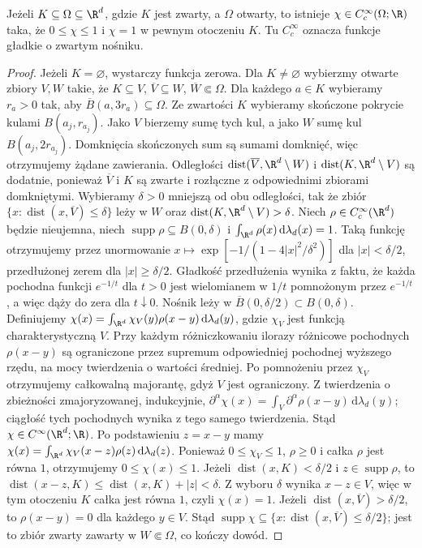 \begin{lemat}
\label{lem:cutoffs17}
Jeżeli $K\subseteq\Omega\subseteq\R^d$, gdzie $K$ jest zwarty,
a $\Omega$ otwarty, to istnieje $\chi\in C_c^\infty(\Omega;\R)$
taka, że $0\le\chi\le1$ i $\chi=1$ w pewnym otoczeniu $K$.
Tu $C_c^\infty$ oznacza funkcje gładkie o zwartym nośniku.
\end{lemat}
\begin{proof}
Jeżeli $K=\varnothing$, wystarczy funkcja zerowa.
Dla $K\ne\varnothing$ wybierzmy otwarte zbiory $V,W$ takie, że
$K\subseteq V$, $\overline V\subseteq W$, $\overline W\Subset\Omega$.
Dla każdego $a\in K$ wybieramy $r_a>0$ tak,
aby $\overline B(a,3r_a)\subseteq\Omega$. Ze zwartości $K$
wybieramy skończone pokrycie kulami $B(a_j,r_{a_j})$.
Jako $V$ bierzemy sumę tych kul, a jako $W$ sumę kul
$B(a_j,2r_{a_j})$. Domknięcia skończonych sum są sumami
domknięć, więc otrzymujemy żądane zawierania.
Odległości $\operatorname{dist}(\overline V,\R^d\setminus W)$
i $\operatorname{dist}(K,\R^d\setminus V)$ są dodatnie,
ponieważ $\overline V$ i $K$ są zwarte
i rozłączne z odpowiednimi zbiorami domkniętymi.
Wybieramy $\delta>0$ mniejszą od obu odległości, tak że zbiór
$\{x:\operatorname{dist}(x,\overline V)\le\delta\}$
leży w $W$ oraz $\operatorname{dist}(K,\R^d\setminus V)>\delta$.
Niech $\rho\in C_c^\infty(\R^d)$ będzie nieujemna,
niech $\operatorname{supp}\rho\subseteq B(0,\delta)$ i
$\int_{\R^d}\rho(x)\,\mathrm d\lambda_d(x)=1$.
Taką funkcję otrzymujemy przez unormowanie
$x\mapsto\exp[-1/(1-4|x|^2/\delta^2)]$ dla $|x|<\delta/2$,
przedłużonej zerem dla $|x|\ge\delta/2$.
Gładkość przedłużenia wynika z faktu, że każda pochodna
funkcji $e^{-1/t}$ dla $t>0$ jest wielomianem w $1/t$
pomnożonym przez $e^{-1/t}$, a więc dąży do zera dla $t\downarrow0$.
Nośnik leży w $\overline B(0,\delta/2)\subset B(0,\delta)$.
Definiujemy $\chi(x)=\int_{\R^d}\chi_V(y)\rho(x-y)\,\mathrm d\lambda_d(y)$,
gdzie $\chi_V$ jest funkcją charakterystyczną $V$.
Przy każdym różniczkowaniu ilorazy różnicowe pochodnych
$\rho(x-y)$ są ograniczone przez supremum odpowiedniej
pochodnej wyższego rzędu, na mocy twierdzenia o wartości średniej.
Po pomnożeniu przez $\chi_V$ otrzymujemy całkowalną majorantę,
gdyż $V$ jest ograniczony. Z twierdzenia o zbieżności
zmajoryzowanej, indukcyjnie,
$\partial^\alpha\chi(x)=\int_V\partial^\alpha\rho(x-y)\,\mathrm d\lambda_d(y)$;
ciągłość tych pochodnych wynika z tego samego twierdzenia.
Stąd $\chi\in C^\infty(\R^d;\R)$.
Po podstawieniu $z=x-y$ mamy
$\chi(x)=\int_{\R^d}\chi_V(x-z)\rho(z)\,\mathrm d\lambda_d(z)$.
Ponieważ $0\le\chi_V\le1$, $\rho\ge0$ i całka $\rho$ jest równa $1$,
otrzymujemy $0\le\chi(x)\le1$.
Jeżeli $\operatorname{dist}(x,K)<\delta/2$ i
$z\in\operatorname{supp}\rho$, to
$\operatorname{dist}(x-z,K)\le\operatorname{dist}(x,K)+|z|<\delta$.
Z wyboru $\delta$ wynika $x-z\in V$, więc w tym otoczeniu
$K$ całka jest równa $1$, czyli $\chi(x)=1$. Jeżeli $\operatorname{dist}(x,\overline V)>\delta/2$,
to $\rho(x-y)=0$ dla każdego $y\in V$.
Stąd $\operatorname{supp}\chi\subseteq
\{x:\operatorname{dist}(x,\overline V)\le\delta/2\}$;
jest to zbiór zwarty zawarty w $W\Subset\Omega$,
co kończy dowód.
\end{proof}

